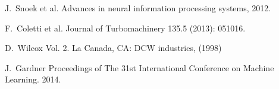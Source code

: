 \documentclass{beamer}
\begin{document}
\begin{frame}[t,allowframebreaks]
\begin{thebibliography}{10}
       \beamertemplatearticlebibitems
          J.~Snoek et al.
          \newblock Advances in neural information processing systems, 2012.

       \beamertemplatearticlebibitems
          F.~Coletti et al.
          \newblock Journal of Turbomachinery 135.5 (2013): 051016.

       \beamertemplatearticlebibitems
          D.~Wilcox
          \newblock Vol. 2. La Canada, CA: DCW industries, (1998)

       \beamertemplatearticlebibitems
          J.~Gardner
          \newblock Proceedings of The 31st International Conference on Machine Learning. 2014.

    \end{thebibliography}
\end{frame}
\end{document}

